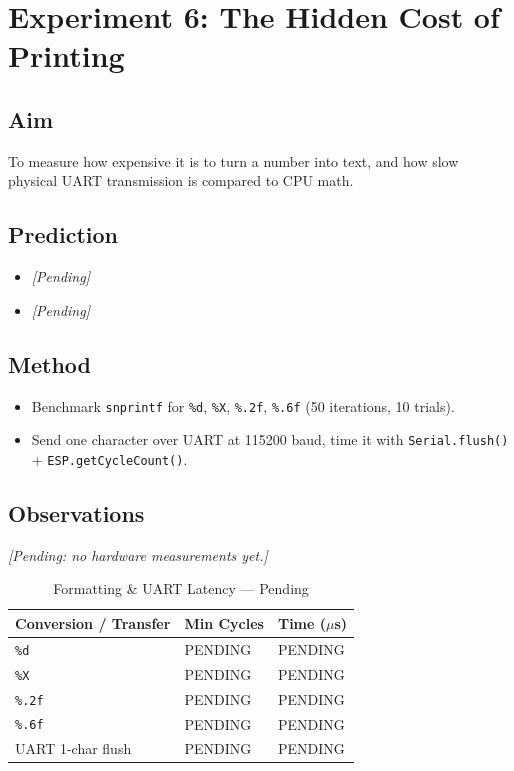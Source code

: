 \section{Experiment 6: The Hidden Cost of Printing}

\subsection{Aim}
To measure how expensive it is to turn a number into text, and how slow physical UART transmission is compared to CPU math.

\subsection{Prediction}
\begin{itemize}[noitemsep]
    \item \textit{[Pending]}
    \item \textit{[Pending]}
\end{itemize}

\subsection{Method}
\begin{itemize}[noitemsep]
    \item Benchmark \texttt{snprintf} for \texttt{\%d}, \texttt{\%X}, \texttt{\%.2f}, \texttt{\%.6f} (50 iterations, 10 trials).
    \item Send one character over UART at 115200 baud, time it with \texttt{Serial.flush()} + \texttt{ESP.getCycleCount()}.
\end{itemize}

\subsection{Observations}
\textit{[Pending: no hardware measurements yet.]}

\begin{table}[htbp]
\centering
\caption{Formatting \& UART Latency --- Pending}
\label{tab:exp6_obs}
\small
\begin{tabularx}{\textwidth}{l X X}
\toprule
\textbf{Conversion / Transfer} & \textbf{Min Cycles} & \textbf{Time ($\mu$s)} \\
\midrule
\texttt{\%d} & PENDING & PENDING \\
\texttt{\%X} & PENDING & PENDING \\
\texttt{\%.2f} & PENDING & PENDING \\
\texttt{\%.6f} & PENDING & PENDING \\
UART 1-char flush & PENDING & PENDING \\
\bottomrule
\end{tabularx}
\end{table}

